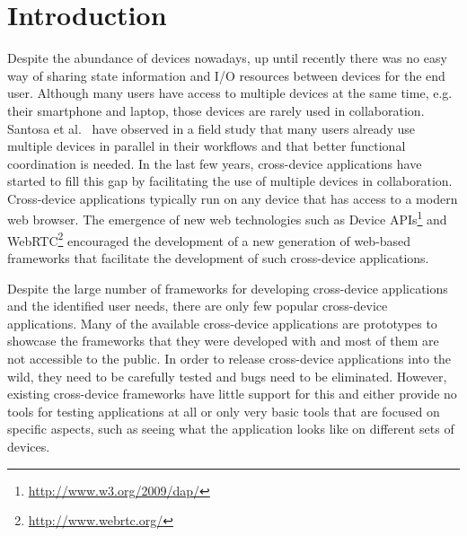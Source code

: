 \chapter{Introduction}

Despite the abundance of devices nowadays, up until recently there was no easy way of sharing state information and I/O resources between devices for the end user. Although many users have access to multiple devices at the same time, e.g. their smartphone and laptop, those devices are rarely used in collaboration. Santosa et al.~\cite{santosa2013} have observed in a field study that many users already use multiple devices in parallel in their workflows and that better functional coordination is needed. In the last few years, cross-device applications have started to fill this gap by facilitating the use of multiple devices in collaboration. Cross-device applications typically run on any device that has access to a modern web browser. The emergence of new web technologies such as Device APIs\footnote{\url{http://www.w3.org/2009/dap/}} and WebRTC\footnote{\url{http://www.webrtc.org/}} encouraged the development of a new generation of web-based frameworks that facilitate the development of such cross-device applications.

Despite the large number of frameworks for developing cross-device applications and the identified user needs, there are only few popular cross-device applications. Many of the available cross-device applications are prototypes to showcase the frameworks that they were developed with and most of them are not accessible to the public. In order to release cross-device applications into the wild, they need to be carefully tested and bugs need to be eliminated. However, existing cross-device frameworks have little support for this and either provide no tools for testing applications at all or only very basic tools that are focused on specific aspects, such as seeing what the application looks like on different sets of devices.

